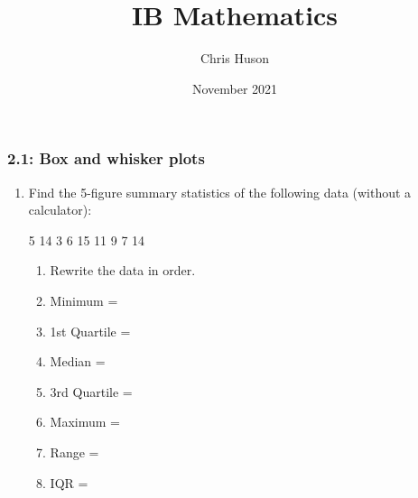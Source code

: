 \documentclass[12pt, twoside]{article}
\title{IB Mathematics}
\author{Chris Huson}
\date{November 2021}
\begin{document}
\subsubsection*{2.1: Box and whisker plots}
\begin{enumerate}
\item Find the 5-figure summary statistics of the following data (without a calculator):
  \begin{center}
  5 14 3 6 15 11 9 7 14
  \end{center}
  \begin{enumerate}[itemsep=0.7cm]
    \item Rewrite the data in order.
    \item Minimum =
    \item 1st Quartile =
    \item Median =
    \item 3rd Quartile =
    \item Maximum =
    \item Range =
    \item IQR =
  \end{enumerate} \vspace{0.5cm}


\end{enumerate}
\end{document}
